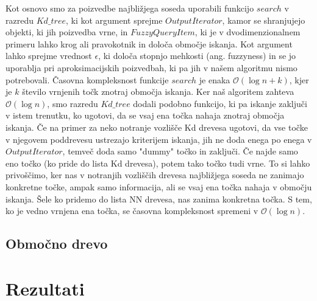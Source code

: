 \documentclass[a4paper, 12pt]{book}
\newcommand{\OO}{\ensuremath{\mathcal{O}}} %
\begin{document}
Kot osnovo smo za poizvedbe najbližjega soseda uporabili funkcijo $search$ v razredu $Kd{\_}tree$, ki kot argument sprejme $OutputIterator$, kamor se shranjujejo objekti, ki jih poizvedba vrne, in $FuzzyQueryItem$, ki je v dvodimenzionalnem primeru lahko krog ali pravokotnik in določa območje iskanja. Kot argument lahko sprejme vrednost $\epsilon$, ki določa stopnjo mehkosti (ang. fuzzyness) in se jo uporablja pri aproksimacijskih poizvedbah, ki pa jih v našem algoritmu nismo potrebovali. Časovna kompleksnost funkcije $search$ je enaka $\OO(\log n + k)$, kjer je $k$ število vrnjenih točk znotraj območja iskanja. Ker naš algoritem zahteva $\OO(\log n)$, smo razredu $Kd{\_}tree$ dodali podobno funkcijo, ki pa iskanje zaključi v istem trenutku, ko ugotovi, da se vsaj ena točka nahaja znotraj območja iskanja. Če na primer za neko notranje vozlišče Kd drevesa ugotovi, da vse točke v njegovem poddrevesu ustrezajo kriterijem iskanja, jih ne doda enega po enega v $OutputIterator$, temveč doda samo "dummy" točko in zaključi. Če najde samo eno točko (ko pride do lista Kd drevesa), potem tako točko tudi vrne. To si lahko privoščimo, ker nas v notranjih vozliščih drevesa najbližjega soseda ne zanimajo konkretne točke, ampak samo informacija, ali se vsaj ena točka nahaja v območju iskanja. Šele ko pridemo do lista NN drevesa, nas zanima konkretna točka. S tem, ko je vedno vrnjena ena točka, se časovna kompleksnost spremeni v $\OO(\log n)$.

\section{Območno drevo}









\chapter{Rezultati}
\label{ch3}
\end{document}
